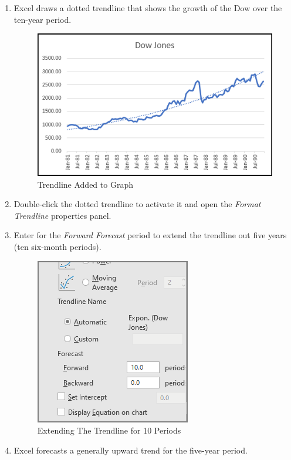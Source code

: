 \begin{enumerate}
	\item Excel draws a dotted trendline that shows the growth of the Dow over the ten-year period.

	\begin{figure}[H]
		\centering
		\includegraphics[width=\maxwidth{.95\linewidth}]{gfx/ch08_fig08}
		\caption{Trendline Added to Graph}
		\label{08:fig08}
	\end{figure}

	\item Double-click the dotted trendline to activate it and open the \textit{Format Trendline} properties panel.
	\item Enter  for the \textit{Forward Forecast} period to extend the trendline out five years (ten six-month periods).

	\begin{figure}[H]
		\centering
		\includegraphics[width=\maxwidth{.50\linewidth}]{gfx/ch08_fig09}
		\caption{Extending The Trendline for 10 Periods}
		\label{08:fig09}
	\end{figure}

	\item Excel forecasts a generally upward trend for the five-year period.


\end{enumerate}
